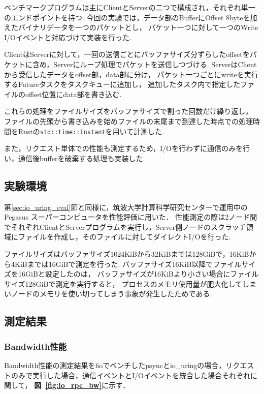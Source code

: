 \documentclass[a4paper,11pt]{jreport}
\newcommand\figref[1]{\textbf{図~\ref{fig:#1}}}
\begin{document}
ベンチマークプログラムは主にClientとServerの二つで構成され，それぞれ単一のエンドポイントを持つ.
今回の実験では，データ部のBufferにOffset 8byteを加えたバイナリデータを一つのパケットとし，
パケット一つに対して一つのWrite I/Oイベントと対応づけて実装を行った.

ClientはServerに対して，一回の送信ごとにバッファサイズ分ずらしたoffsetをパケットに含め，Serverにループ処理でパケットを送信しつづける.
ServerはClientから受信したデータをoffset部，data部に分け，
パケット一つごとにwriteを実行するFutureタスクをタスクキューに追加し，
追加したタスク内で指定したファイルのoffset位置にdata部を書き込む.

これらの処理をファイルサイズをバッファサイズで割った回数だけ繰り返し，
ファイルの先頭から書き込みを始めファイルの末尾まで到達した時点での処理時間をRustの\lstinline|std::time::Instant|を用いて計測した.

また，リクエスト単体での性能も測定するため，I/Oを行わずに通信のみを行い，通信後bufferを破棄する処理も実装した.

\subsection{実験環境}
第\ref{sec:io_uring_eval}節と同様に，筑波大学計算科学研究センターで運用中のPegasus スーパーコンピュータを性能評価に用いた．
性能測定の際は2ノード間でそれぞれClientとServerプログラムを実行し，Server側ノードのスクラッチ領域にファイルを作成し，そのファイルに対してダイレクトI/Oを行った.

ファイルサイズはバッファサイズ1024KiBから32KiBまでは128GiBで，16KiBから4KiBまでは16GiBで測定を行った.
バッファサイズ16KiB以降でファイルサイズを16GiBと設定したのは，
バッファサイズが16KiBより小さい場合にファイルサイズ128GiBで測定を実行すると，
プロセスのメモリ使用量が肥大化してしまいノードのメモリを使い切ってしまう事象が発生したためである.

\subsection{測定結果}\label{sec:io_rpc_result}
\subsubsection{Bandwidth性能}
Bandwidth性能の測定結果をfioでベンチしたpsyncとio\_uringの場合，リクエストのみで実行した場合，通信イベントとI/Oイベントを統合した場合それぞれに関して，
\figref{io_rpc_bw}に示す．
\end{document}
